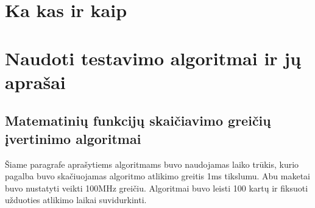\documentclass[a4paper, 12pt]{article} %
\begin{document}
\begin{onehalfspacing}
\newpage %
\section{Ka kas ir kaip}
%
\section{Naudoti testavimo algoritmai ir j\k{u} apra\v{s}ai}
\subsection{Matematini\k{u} funkcij\k{u} skai\v{c}iavimo grei\v{c}i\k{u} \k{i}vertinimo algoritmai}
\v{S}iame paragrafe apra\v{s}ytiems algoritmams buvo naudojamas laiko tr\=ukis, kurio pagalba buvo ska\v{c}iuojamas algoritmo atlikimo greitis 1ms tikslumu. Abu maketai buvo nustatyti veikti 100MHz grei\v{c}iu. Algoritmai buvo leisti 100 kart\k{u} ir fiksuoti u\v{z}duoties atlikimo laikai suvidurkinti.

\end{onehalfspacing}
\end{document}
